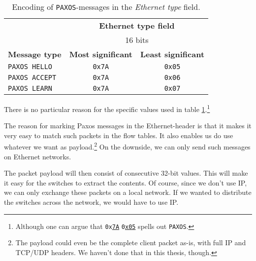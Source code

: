 \begin{table}[H]
  \centering
  \begin{tabular}{l|c|c|}
    \cline{2-3}
      & \multicolumn{2}{c|}{\textbf{Ethernet type field}} \\
      & \multicolumn{2}{c|}{16 bits} \\

    \hline
      \multicolumn{1}{|l|}{\textbf{Message type}} &
      \textbf{Most significant} &
      \textbf{Least significant} \\

    \hline
      \multicolumn{1}{|l|}{\texttt{PAXOS HELLO}} &
      \texttt{0x7A} &
      \texttt{0x05} \\

    \hline
      \multicolumn{1}{|l|}{\texttt{PAXOS ACCEPT}} &
      \texttt{0x7A} &
      \texttt{0x06} \\

    \hline
      \multicolumn{1}{|l|}{\texttt{PAXOS LEARN}} &
      \texttt{0x7A} &
      \texttt{0x07} \\

    \hline
  \end{tabular}
  \caption{Encoding of \texttt{PAXOS}-messages in the \textit{Ethernet
    type} field.}
  \label{table:paxos.ethernet.type.encoding}
\end{table}

There is no particular reason for the specific values used in table
\ref{table:paxos.ethernet.type.encoding}.\footnote{Although one can argue
that \texttt{0x\underline{7A}} \texttt{0\underline{x05}} spells out \texttt{PAXOS}.}

The reason for marking Paxos messages in the
Ethernet-header is that it
makes it very easy to match such packets in the flow
tables.  It also
enables us do use whatever we want as payload.\footnote{The payload could
even be the complete client packet as-is, with full IP and TCP/UDP
headers.  We haven't done that in this thesis, though.} On the downside,
we can only send such messages on Ethernet networks.

The packet payload will then consist of consecutive 32-bit values.
This will make it easy for the switches to extract the contents.
Of course, since we don't use IP, we can only exchange these packets on a
local network.  If we wanted to distribute the switches across the network,
we would have to use IP.

